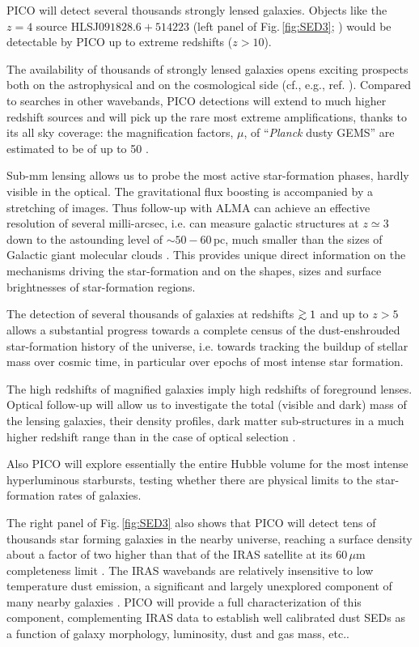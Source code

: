 \documentclass[11pt,a4paper]{article}
\def\simgt{\mathrel{\rlap{\lower 3pt\hbox{$\sim$}} \raise2.0pt\hbox{$>$}}}
\begin{document}
PICO will detect several thousands strongly lensed galaxies. Objects like the
$z=4$ source  HLSJ$091828.6+514223$ (left panel of Fig.\,\ref{fig:SED3};
\cite{Combes2012}) would be detectable by PICO up to extreme redshifts
($z>10$).

The availability of thousands of strongly lensed galaxies opens exciting
prospects both  on the astrophysical and on the cosmological side (cf., e.g.,
ref. \cite{Treu2010}). Compared to searches in other wavebands, PICO detections
will extend to much higher redshift sources \cite[most optically-selected
strongly lensed galaxies are at $z<1$, cf. Fig.\,7 of ref. ][]{Treu2010} and
will pick up the rare most extreme amplifications, thanks to its all sky
coverage: the magnification factors, $\mu$, of ``\textit{Planck} dusty GEMS''
are estimated to be of up to 50 \cite{Canameras2015}.

Sub-mm lensing allows us to probe the most active star-formation phases,
hardly visible in the optical. The gravitational flux boosting is accompanied
by a stretching of images. Thus follow-up  with ALMA can achieve an effective
resolution of several milli-arcsec, i.e. can measure galactic structures at
$z\simeq 3$ down to the astounding level of $\sim 50-60\,$pc, much smaller than
the sizes of Galactic giant molecular clouds \cite{Canameras2017ALMA}. This
provides unique direct information on the mechanisms driving the star-formation
and on the shapes, sizes and surface brightnesses of star-formation regions.

The detection of several thousands of galaxies at redshifts $\simgt 1$  and up
to $z>5$ allows a substantial progress towards a complete census of the
dust-enshrouded star-formation history of the universe, i.e. towards tracking
the buildup of stellar mass over cosmic time, in particular over epochs of most
intense star formation.

The high redshifts of magnified galaxies imply high redshifts of  foreground
lenses. Optical follow-up will allow us to investigate the total (visible and
dark) mass of the lensing galaxies, their density profiles, dark matter
sub-structures in a much higher redshift range than in the case of optical
selection \cite{Canameras2017lens}.

Also PICO will explore essentially the entire Hubble volume for the most
intense hyperluminous starbursts, testing whether there are physical limits to
the star-formation rates of galaxies.

The right panel of Fig.\,\ref{fig:SED3} also shows that PICO will detect tens
of thousands star forming galaxies in the nearby universe, reaching a surface
density about a factor of two higher than that of the IRAS satellite at its
$60\,\mu$m completeness limit \cite{RowanRobinson1991}. The IRAS wavebands  are
relatively insensitive to low temperature dust emission, a significant and
largely unexplored component of many nearby galaxies
\cite{Planck2011nearby_gal}. PICO will provide a full characterization of this
component, complementing IRAS data to establish well calibrated dust SEDs as a
function of galaxy morphology, luminosity, dust and gas mass, etc..
\end{document}
